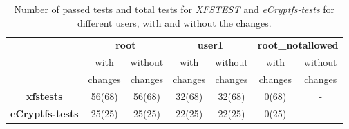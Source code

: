 
\begin{table*}[th]
\small
\centering

\begin{tabular}{ c|c|c|c|c|c|c| }
  \cline{2-7}
  & 
  \multicolumn{2}{c}{\textbf{root}} &
  \multicolumn{2}{|c}{\textbf{user1}} &
  \multicolumn{2}{|c|}{\textbf{root\_notallowed}}\\ 
  \cline{2-7}
  \multicolumn{1}{c|}{} &
  with & without & with & without & with & without\\
  \multicolumn{1}{c|}{} &
  changes & changes & changes & changes & changes & changes\\
  \hline
  \multicolumn{1}{|c|}{\textbf{xfstests}}
  & 56(68) & 56(68) & 32(68) & 32(68) & 0(68) & - \\
  \hline
  \multicolumn{1}{|c|}{\textbf{eCryptfs-tests}}
  & 25(25) & 25(25) & 22(25) & 22(25) & 0(25) & - \\
  \hline
\end{tabular}

\caption{\capfont Number of passed tests and total tests for
\emph{XFSTEST} and \emph{eCryptfs-tests} for different users, with and
without the changes.}
\label{tab:results-xfs}
\end{table*}

